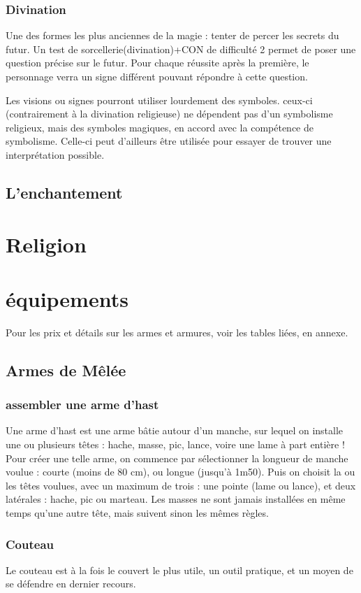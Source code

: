 \documentclass[10pt,a4paper,twocolumn]{book}
\begin{document}
\subsubsection{Divination}
Une des formes les plus anciennes de la magie : tenter de percer les secrets du futur. Un test de sorcellerie(divination)+CON de difficulté 2 permet de poser une question précise sur le futur. Pour chaque réussite après la première, le personnage verra un signe différent pouvant répondre à cette question.

Les visions ou signes pourront utiliser lourdement des symboles. ceux-ci (contrairement à la divination religieuse) ne dépendent pas d'un symbolisme religieux, mais des symboles magiques, en accord avec la compétence de symbolisme. Celle-ci peut d'ailleurs être utilisée pour essayer de trouver une interprétation possible.
\subsection{L'enchantement}
\section{Religion}
\section{équipements}
Pour les prix et détails sur les armes et armures, voir les tables liées, en annexe.
\subsection{Armes de Mêlée}
\subsubsection{assembler une arme d’hast}
Une arme d’hast est une arme bâtie autour d’un manche, sur lequel on installe une ou plusieurs têtes : hache, masse, pic, lance, voire une lame à part entière ! Pour créer une telle arme, on commence par sélectionner la longueur de manche voulue : courte (moins de 80 cm), ou longue (jusqu’à 1m50). Puis on choisit la ou les têtes voulues, avec un maximum de trois : une pointe (lame ou lance), et deux latérales : hache, pic ou marteau. Les masses ne sont jamais installées en même temps qu’une autre tête, mais suivent sinon les mêmes règles.
\subsubsection{Couteau}
Le couteau est à la fois le couvert le plus utile, un outil pratique, et un moyen de se défendre en dernier recours.
\end{document}
